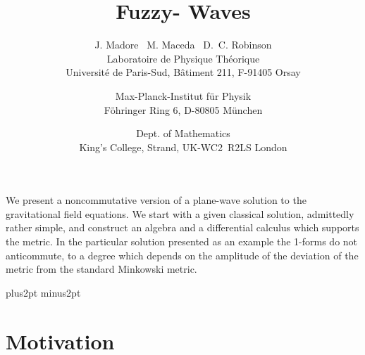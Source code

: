 \documentclass[12pt,a4paper]{article}
\newcounter{eg}
\providecommand{\initiate}{\setcounter{equation}{0}}
\begin{document}
\title{Fuzzy-{\coordHE{}} Waves}

\author{J. Madore\coordHE{} \ M. Maceda\coordHE{} \
        D.~C. Robinson\coordHE{}\\[10pt]
        \myHighlight{$\strut^{1}$}\coordHE{}Laboratoire de Physique Th\'eorique\\
        Universit\'e de Paris-Sud, B\^atiment 211, F-91405 Orsay%
\and    \myHighlight{$\strut^{2}$}\coordHE{}Max-Planck-Institut f\"ur Physik\\
        F\"ohringer Ring 6, D-80805 M\"unchen\\[5pt]
\and    {}\coordHE{}Dept. of Mathematics\\
        King's College, Strand, UK-WC2~R2LS London}

\date{}

\maketitle

\abstract

We present a noncommutative version of a plane-wave solution to the
gravitational field equations. We start with a given classical
solution, admittedly rather simple, and construct an algebra and a
differential calculus which supports the metric. In the particular
solution presented as an example the 1-forms do not anticommute, to a
degree which depends on the amplitude of the deviation of the metric
from the standard Minkowski metric.


\vfill

\medskip
\eject

\parskip 4pt plus2pt minus2pt

\initiate
\section{Motivation}
\end{document}
